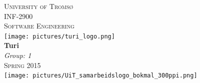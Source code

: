 \documentclass[a4paper]{article}
\begin{document}
\begin{titlepage}

\newcommand{\HRule}{\rule{\linewidth}{0.7mm}} %


\center %
 

\textsc{\LARGE University of Tromsø}\\[1.5cm] %
\textsc{\Large INF-2900}\\[0.5cm] %
\textsc{\large Software Engineering}\\[3cm] %


\texttt{[image: pictures/turi\_logo.png]}\\[0.5cm]
{ \huge \bfseries Turi}\\[2cm] %
 


\Large \emph{Group: 1}\\[1.5cm]

\textsc{\large Spring 2015}\\[2cm] %


\texttt{[image: pictures/UiT\_samarbeidslogo\_bokmal\_300ppi.png]}\\[1cm] 
 

\vfill %

\end{titlepage}
\end{document}
